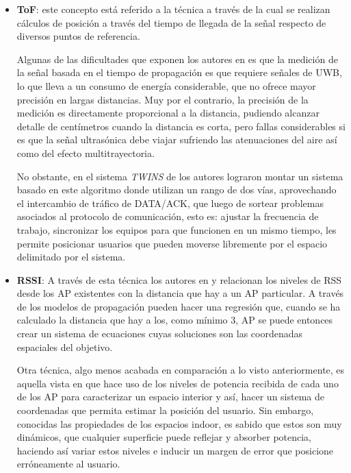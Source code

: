 \begin{enumerate}
{    \begin{itemize}
        \item{\textbf{\ac{ToF}}: este concepto está referido a la técnica a través de la cual se realizan cálculos de posición a través del tiempo de llegada de la señal respecto de diversos puntos de referencia.\cite{5}
            
        Algunas de las dificultades que exponen los autores en \cite{22} es que la medición de la señal basada en el  tiempo de propagación es que requiere señales de \ac{UWB}, lo que lleva a un consumo de energía considerable, que no ofrece mayor precisión en largas distancias. Muy por el contrario, la precisión de la medición es directamente proporcional a la distancia, pudiendo alcanzar detalle de centímetros cuando la distancia es corta, pero fallas considerables si es que la señal ultrasónica debe viajar sufriendo las atenuaciones del aire así como del efecto multitrayectoria.
            
        No obstante, en el sistema \textit{TWINS} de \cite{2} los autores lograron montar un sistema basado en este algoritmo donde utilizan un rango de dos vías, aprovechando el intercambio de tráfico de DATA/ACK, que luego de sortear problemas asociados al protocolo de comunicación, esto es:  ajustar la frecuencia de trabajo, sincronizar los equipos para que funcionen en un mismo tiempo, les permite posicionar usuarios que pueden moverse libremente por el espacio delimitado por el sistema.}
        
        \item{\textbf{\ac{RSSI}}: A través de esta técnica los autores en \cite{3} y \cite{4} relacionan los niveles de \ac{RSS} desde los \ac{AP} existentes con la distancia que hay a un AP particular. A través de los modelos de propagación pueden hacer una regresión que, cuando se ha calculado la distancia que hay a los, como mínimo 3, AP se puede entonces crear un sistema de ecuaciones cuyas soluciones son las coordenadas espaciales del objetivo.
        
        Otra técnica, algo menos acabada en comparación a lo visto anteriormente, es aquella vista en \cite{13} que hace uso de los niveles de potencia recibida de cada uno de los AP para caracterizar un espacio interior y así, hacer un sistema de coordenadas que permita estimar la posición del usuario. Sin embargo, conocidas las propiedades de los espacios indoor, es sabido que estos son muy dinámicos, que cualquier superficie puede reflejar y absorber potencia, haciendo así variar estos niveles e inducir un margen de error que posicione erróneamente al usuario.
        
}
\end{itemize}}
\end{enumerate}
